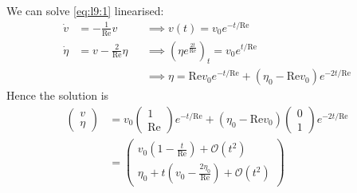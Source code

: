 \documentclass{jknotes}
\newcommand{\ReN}{\text{Re}}
\begin{document}
We can solve \eqref{eq:l9:1} linearised:
\begin{align}
	\dot{v} &= -\frac{1}{\ReN} v &&\implies v(t) = v_0 e^{-t/\ReN} \\
	\dot{\eta} &= v - \frac{2}{\ReN} \eta &&\implies (\eta e^{\frac{2t}{\ReN}})_t
			   = v_0 e^{t/\ReN} \\
			   & &&\implies \eta = \ReN v_0 e^{-t/\ReN} + (\eta_0 - \ReN
		v_0)e^{-2t/\ReN}
\end{align}
Hence the solution is
\begin{align}
	\begin{pmatrix} v \\ \eta \end{pmatrix} &= v_0 \begin{pmatrix} 1 \\ \ReN
	\end{pmatrix} e^{-t/\ReN} + (\eta_0 - \ReN v_0) \begin{pmatrix} 0 \\ 1
	\end{pmatrix} e^{-2t/\ReN} \\
	&= \begin{pmatrix} v_0\left(1-\frac{t}{\ReN}\right) + \mathcal{O}(t^2) \\
		\eta_0 + t\left(v_0 - \frac{2\eta_0}{\ReN}\right) + \mathcal{O}(t^2)
	\end{pmatrix}
\end{align}
\end{document}
